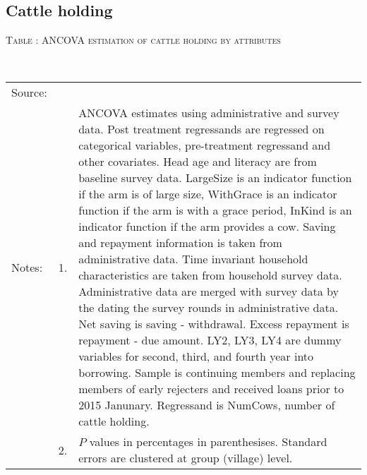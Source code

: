 \subsection{Cattle holding}


\hspace{-1cm}\begin{minipage}[t]{14cm}
\hfil\textsc{\normalsize Table \thetable: ANCOVA estimation of cattle holding by attributes\label{tab ANCOVA cow attributes}}\\
\setlength{\tabcolsep}{1pt}
\setlength{\baselineskip}{8pt}
\renewcommand{\arraystretch}{.55}
\hfil{}\\
\renewcommand{\arraystretch}{.8}
\setlength{\tabcolsep}{1pt}
\begin{tabular}{>{\hfill\scriptsize}p{1cm}<{}>{\hfill\scriptsize}p{.25cm}<{}>{\scriptsize}p{12cm}<{\hfill}}
Source:& \multicolumn{2}{l}{\scriptsize Estimated with GUK administrative and survey data.}\\
Notes: & 1. & ANCOVA estimates using administrative and survey data. Post treatment regressands are regressed on categorical variables, pre-treatment regressand and other covariates. Head age and literacy are from baseline survey data.  \textsf{LargeSize} is an indicator function if the arm is of large size, \textsf{WithGrace} is an indicator function if the arm is with a grace period, \textsf{InKind} is an indicator function if the arm provides a cow. Saving and repayment information is taken from administrative data. Time invariant household characteristics are taken from household survey data. Administrative data are merged with survey data by the dating the survey rounds in administrative data. Net saving is saving - withdrawal. Excess repayment is repayment - due amount. \textsf{LY2, LY3, LY4} are dummy variables for second, third, and 	fourth year into borrowing. Sample is continuing members and replacing members of early rejecters and received loans prior to 2015 Janunary. Regressand is \textsf{NumCows}, number of cattle holding. \\
& 2. & $P$ values in percentages in parenthesises. Standard errors are clustered at group (village) level.
\end{tabular}
\end{minipage}

